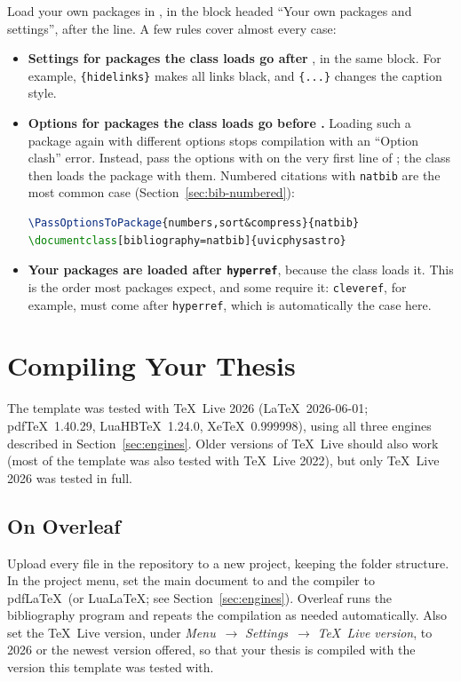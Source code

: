 Load your own packages in , in the block headed ``Your own packages and settings'', after the  line. A few rules cover almost every case:
\begin{itemize}
    \item \textbf{Settings for packages the class loads go after }, in the same block. For example, \texttt{\{hidelinks\}} makes all links black, and \texttt{\{...\}} changes the caption style.
    \item \textbf{Options for packages the class loads go before .} Loading such a package again with different options stops compilation with an ``Option clash'' error. Instead, pass the options with  on the very first line of ; the class then loads the package with them. Numbered citations with \texttt{natbib} are the most common case (Section~\ref{sec:bib-numbered}):
\begin{lstlisting}[language=TeX]
\PassOptionsToPackage{numbers,sort&compress}{natbib}
\documentclass[bibliography=natbib]{uvicphysastro}
\end{lstlisting}
    \item \textbf{Your packages are loaded after \texttt{hyperref}}, because the class loads it. This is the order most packages expect, and some require it: \texttt{cleveref}, for example, must come after \texttt{hyperref}, which is automatically the case here.
\end{itemize}

\section{Compiling Your Thesis}
\label{sec:compiling}

The template was tested with \TeX\ Live 2026 (\LaTeX\ 2026-06-01; pdf\TeX\ 1.40.29, Lua\-HB\TeX\ 1.24.0, Xe\TeX\ 0.999998), using all three engines described in Section~\ref{sec:engines}. Older versions of \TeX\ Live should also work (most of the template was also tested with \TeX\ Live 2022), but only \TeX\ Live 2026 was tested in full.

\subsection{On Overleaf}

Upload every file in the repository to a new project, keeping the folder structure. In the project menu, set the main document to  and the compiler to pdf\LaTeX\ (or Lua\LaTeX; see Section~\ref{sec:engines}). Overleaf runs the bibliography program and repeats the compilation as needed automatically. Also set the \TeX\ Live version, under \emph{Menu}~$\rightarrow$ \emph{Settings}~$\rightarrow$ \emph{\TeX\ Live version}, to 2026 or the newest version offered, so that your thesis is compiled with the version this template was tested with.

